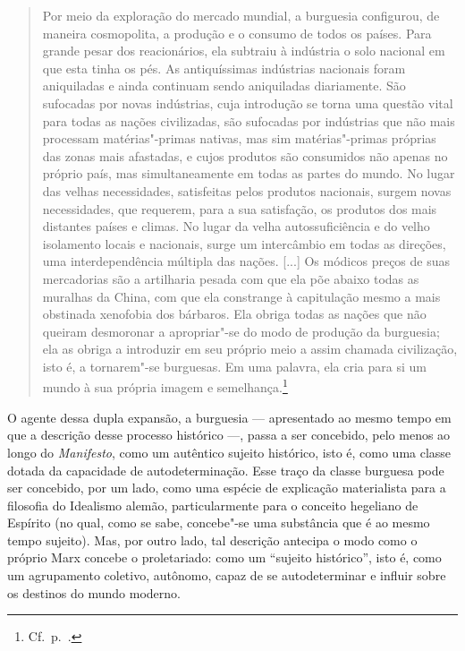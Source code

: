 \begin{quote} 
Por meio da exploração do mercado mundial, a burguesia configurou, de
maneira cosmopolita, a produção e o consumo de todos os países. Para
grande pesar dos reacionários, ela subtraiu à indústria o solo nacional
em que esta tinha os pés. As antiquíssimas indústrias nacionais foram
aniquiladas e ainda continuam sendo aniquiladas diariamente. São
sufocadas por novas indústrias, cuja introdução se torna uma questão
vital para todas as nações civilizadas, são sufocadas por indústrias que não mais
processam matérias"-primas nativas, mas sim matérias"-primas próprias
das zonas mais afastadas, e cujos produtos são consumidos não apenas no
próprio país, mas simultaneamente em todas as partes do mundo. No lugar
das velhas necessidades, satisfeitas pelos produtos nacionais, surgem
novas necessidades, que requerem, para a sua satisfação, os produtos dos
mais distantes países e climas. No lugar da velha autossuficiência e
do velho isolamento locais e nacionais, surge um intercâmbio em
todas as direções, uma interdependência múltipla das nações. [...] Os
módicos preços de suas mercadorias são a artilharia pesada com que ela
põe abaixo todas as muralhas da China, com que ela constrange à
capitulação mesmo a mais obstinada xenofobia dos bárbaros. Ela obriga
todas as nações que não queiram desmoronar a apropriar"-se do modo de
produção da burguesia; ela as obriga a introduzir em seu próprio meio a
assim chamada civilização, isto é, a tornarem"-se burguesas. Em uma
palavra, ela cria para si um mundo à sua própria imagem e semelhança.\footnote{ Cf.~p.~\pageref{5}.}
\end{quote} 

O agente dessa dupla expansão, a burguesia --- apresentado ao mesmo tempo
em que a descrição desse processo histórico ---, passa a ser concebido,
pelo menos ao longo do \textit{Manifesto}, como um autêntico sujeito
histórico, isto é, como uma classe dotada da capacidade de
autodeterminação. Esse traço da classe burguesa pode ser concebido, por
um lado, como uma espécie de explicação materialista para a filosofia
do Idealismo alemão, particularmente para o conceito hegeliano de
Espírito (no qual, como se sabe, concebe"-se uma substância que é ao
mesmo tempo sujeito). Mas, por outro lado, tal descrição antecipa o
modo como o próprio Marx concebe o proletariado: como um “sujeito
histórico”, isto é, como um agrupamento coletivo, autônomo, capaz de se
autodeterminar e influir sobre os destinos do mundo moderno.

